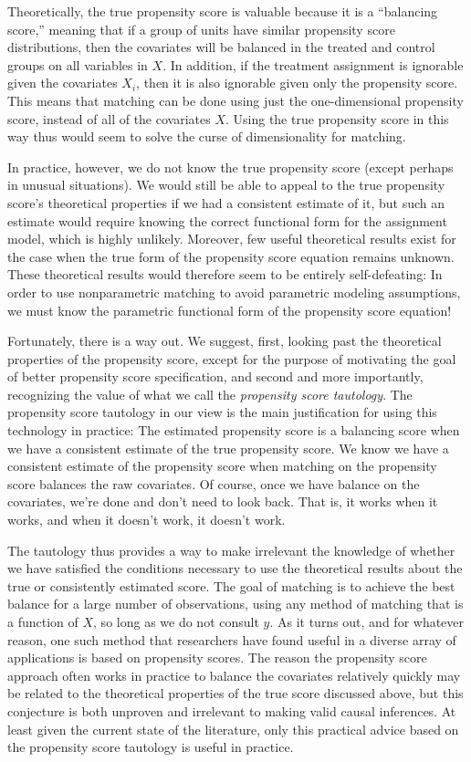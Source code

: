 \documentclass[11pt,titlepage]{article}
\begin{document}
Theoretically, the true propensity score is valuable because it is a
``balancing score,'' meaning that if a group of units have similar
propensity score distributions, then the covariates will be balanced
in the treated and control groups on all variables in $X$.  In
addition, if the treatment assignment is ignorable given the
covariates $X_i$, then it is also ignorable given only the propensity
score.  This means that matching can be done using just the
one-dimensional propensity score, instead of all of the covariates
$X$.  Using the true propensity score in this way thus would seem to
solve the curse of dimensionality for matching.

In practice, however, we do not know the true propensity score (except
perhaps in unusual situations).  We would still be able to appeal to
the true propensity score's theoretical properties if we had a
consistent estimate of it, but such an estimate would require knowing
the correct functional form for the assignment model, which is highly
unlikely.  Moreover, few useful theoretical results exist for the case
when the true form of the propensity score equation remains unknown.
These theoretical results would therefore seem to be entirely
self-defeating: In order to use nonparametric matching to avoid
parametric modeling assumptions, we must know the parametric
functional form of the propensity score equation!

Fortunately, there is a way out.  We suggest, first, looking past the
theoretical properties of the propensity score, except for the purpose
of motivating the goal of better propensity score specification, and
second and more importantly, recognizing the value of what we call the
\emph{propensity score tautology}.  The propensity score tautology in
our view is the main justification for using this technology in
practice: The estimated propensity score is a balancing score when we
have a consistent estimate of the true propensity score.  We know we
have a consistent estimate of the propensity score when matching on
the propensity score balances the raw covariates.  Of course, once we
have balance on the covariates, we're done and don't need to look
back.  That is, it works when it works, and when it doesn't work, it
doesn't work.

The tautology thus provides a way to make irrelevant the knowledge of
whether we have satisfied the conditions necessary to use the
theoretical results about the true or consistently estimated score.
The goal of matching is to achieve the best balance for a large number
of observations, using any method of matching that is a function of
$X$, so long as we do not consult $y$.  As it turns out, and for
whatever reason, one such method that researchers have found useful in
a diverse array of applications is based on propensity scores.  The
reason the propensity score approach often works in practice to
balance the covariates relatively quickly may be related to the
theoretical properties of the true score discussed above, but this
conjecture is both unproven and irrelevant to making valid causal
inferences.  At least given the current state of the literature, only
this practical advice based on the propensity score tautology is
useful in practice.
\end{document}
